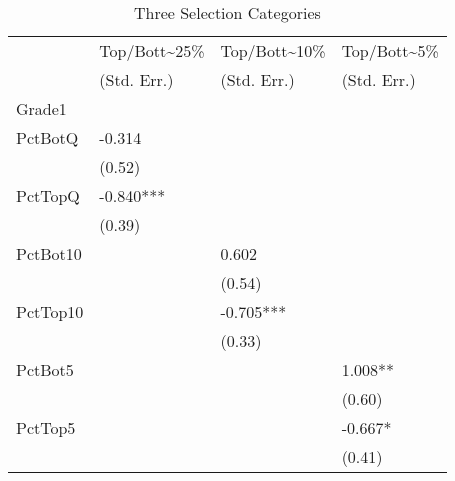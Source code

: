 \begin{table}[htb]
  \centering
  \begin{threeparttable}
    \caption{Three Selection Categories}\label{tab:3sc}
    \begin{tabular}{l l l l} 
      \hline
      \hline
               & Top/Bott{\textasciitilde}25\% & Top/Bott{\textasciitilde}10\% & Top/Bott{\textasciitilde}5\% \\
               & (Std. Err.)                   & (Std. Err.)                   & (Std. Err.)                  \\
      \hline
      Grade1   &                               &                               &                              \\
      PctBotQ  & -0.314                        &                               &                              \\
               & (0.52)                        &                               &                              \\
      PctTopQ  & -0.840***                     &                               &                              \\
               & (0.39)                        &                               &                              \\
      PctBot10 &                               & 0.602                         &                              \\
               &                               & (0.54)                        &                              \\
      PctTop10 &                               & -0.705***                     &                              \\
               &                               & (0.33)                        &                              \\
      PctBot5  &                               &                               & 1.008**                      \\
               &                               &                               & (0.60)                       \\
      PctTop5  &                               &                               & -0.667*                      \\
               &                               &                               & (0.41)                       \\

\end{tabular}
\end{threeparttable}
\end{table}
